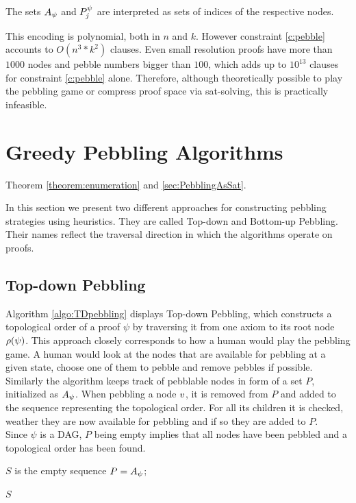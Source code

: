 \documentclass{llncs}
\begin{document}
The sets $A_{\psi}$ and $P_{j}^{\psi}$ are interpreted as sets of indices of the respective nodes.

\noindent
This encoding is polynomial, both in $n$ and $k$. However constraint \ref{c:pebble} accounts to $O(n^3*k^2)$ clauses. Even small resolution proofs have more than $1000$ nodes and pebble numbers bigger than $100$, which adds up to $10^{13}$ clauses for constraint \ref{c:pebble} alone. Therefore, although theoretically possible to play the pebbling game or compress proof space via sat-solving, this is practically infeasible.


\section{Greedy Pebbling Algorithms}
\label{section:algorithms}

Theorem \ref{theorem:enumeration} and \ref{sec:PebblingAsSat}.

In this section we present two different approaches for constructing pebbling strategies using heuristics.
They are called Top-down and Bottom-up Pebbling. Their names reflect the traversal direction in which the algorithms operate on proofs.

\subsection{Top-down Pebbling}

Algorithm \ref{algo:TDpebbling} displays Top-down Pebbling, which constructs a topological order of a proof $\psi$ by traversing it from one axiom to its root node $\rho(\psi)$.
This approach closely corresponds to how a human would play the pebbling game. 
A human would look at the nodes that are available for pebbling at a given state, choose one of them to pebble and remove pebbles if possible.\\
Similarly the algorithm keeps track of pebblable nodes in form of a set $P$, initialized as $A_{\psi}$.
When pebbling a node $v$, it is removed from $P$ and added to the sequence representing the topological order. 
For all its children it is checked, weather they are now available for pebbling and if so they are added to $P$.\\
Since $\psi$ is a DAG, $P$ being empty implies that all nodes have been pebbled and a topological order has been found.


\begin{algorithm}[h]
	
	$S$ is the empty sequence\;
	$P = A_{\psi}$;
	
	
	\Return $S$\;
	
  \caption[.]{}
  \label{algo:TDpebbling}
\end{algorithm}
\end{document}
